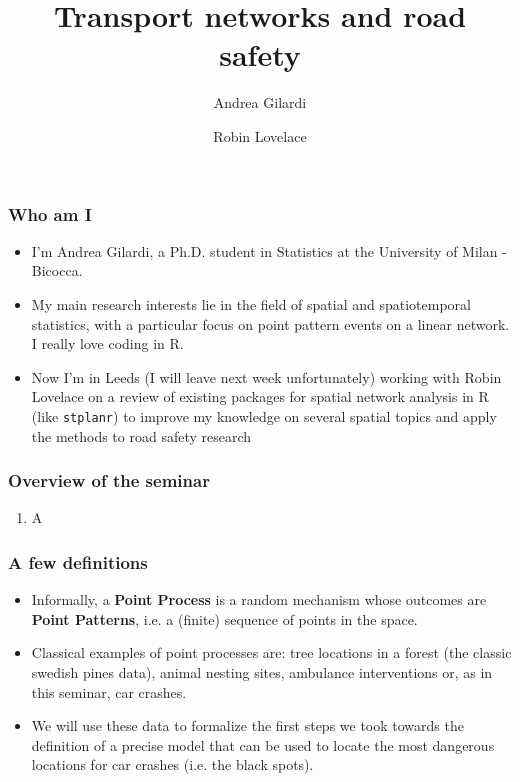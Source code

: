 \documentclass[c,10pt,pdftex]{beamer}
\title{Transport networks and road safety}
\author{Andrea Gilardi \inst{1} \and Robin Lovelace \inst{2}}
\institute{\inst{1} University of Milan - Bicocca \and \inst{2} University of Leeds - ITS}
\begin{document}
\inserttitlepage

\begin{frame}
\frametitle{Who am I}
\vspace{-0.75cm}
\begin{itemize}
	\setlength\itemsep{1em}
	\item I'm Andrea Gilardi, a Ph.D. student in Statistics at the University of Milan - Bicocca. 
	\item My main research interests lie in the field of spatial and spatiotemporal statistics, with a particular focus on point pattern events on a linear network. I really love coding in R. 
	
	\item Now I'm in Leeds (I will leave next week unfortunately) working with Robin Lovelace on a review of existing packages for spatial network analysis in R (like \texttt{stplanr}) to improve my knowledge on several spatial topics and apply the methods to road safety research
\end{itemize}
\end{frame}

\begin{frame}
\frametitle{Overview of the seminar}
\begin{enumerate}
	\item A
\end{enumerate}
\end{frame}

\begin{frame}
\frametitle{A few definitions}
\vspace{-0.75cm}
\begin{itemize}
	\setlength\itemsep{1em}
	\item Informally, a \textbf{Point Process} is a random mechanism whose outcomes are \textbf{Point Patterns}, i.e. a (finite) sequence of points in the space. 
	
	\item Classical examples of point processes are: tree locations in a forest (the classic swedish pines data), animal nesting sites, ambulance interventions or, as  in this seminar, car crashes. 
	
	\item We will use these data to formalize the first steps we took towards the definition of a precise model that can be used to locate the most dangerous locations for car crashes (i.e. the black spots). 
\end{itemize}
\end{frame}
\end{document}
